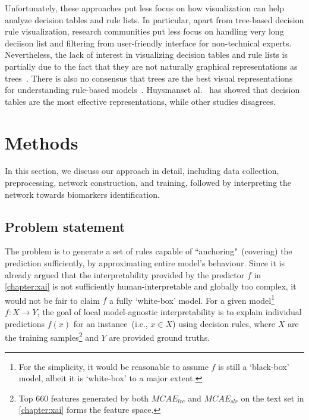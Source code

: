 \hspace*{3.5mm} Unfortunately, these approaches put less focus on how visualization can help analyze decision tables and rule lists. In particular, apart from tree-based decision rule visualization, research communities put less focus on handling very long deciison list and filtering from user-friendly interface for non-technical experts. Nevertheless, the lack of interest in visualizing decision tables and rule lists is partially due to the fact that they are not naturally graphical representations as trees~\cite{ming2018rulematrix}. There is also no consensus that trees are the best visual representations for understanding rule-based models~\cite{ming2018rulematrix}. Huysmanset al.~\cite{mehrabi2019survey} has showed that decision tables are the most effective representations, while other studies disagrees.

\section{Methods} \label{chapter_7:mm}
In this section, we discuss our approach in detail, including data collection, preprocessing, network construction, and training, followed by interpreting the network towards biomarkers identification. 

\subsection{Problem statement}
The problem is to generate a set of rules capable of ``anchoring"~(covering) the prediction sufficiently, by approximating entire model's behaviour. Since it is already argued that the interpretability provided by the predictor ${f}$ in \cref{chapter:xai} is not sufficiently human-interpretable and globally too complex, it would not be fair to claim ${f}$ a fully `white-box' model. For a given model\footnote{For the simplicity, it would be reasonable to assume ${f}$ is  still a `black-box' model, albeit it is `white-box' to a major extent.} ${f}: X \rightarrow Y$, the goal of local model-agnostic interpretability is to explain individual predictions ${f}(x)$ for an instance~(i.e., $x \in X$) using decision rules, where $X$ are the training samples\footnote{Top 660 features generated by both $MCAE_{lrc}$ and $MCAE_{slr}$ on the text set in \cref{chapter:xai} forms the feature space.} and $Y$ are provided ground truths. %

